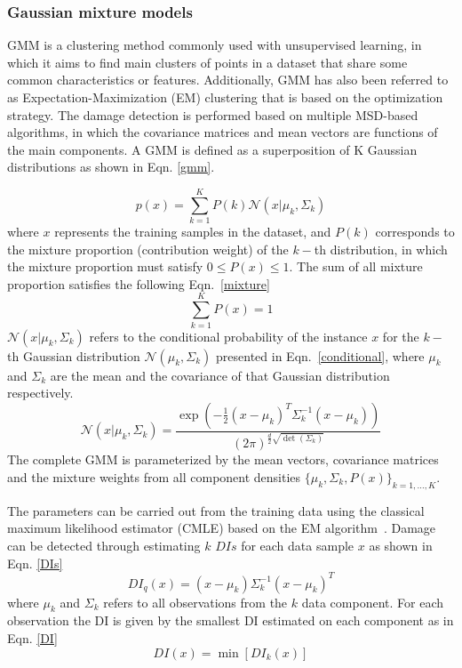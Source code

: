 \subsubsection{Gaussian mixture models}
GMM is a clustering method commonly used with unsupervised learning, in which it aims to find main clusters of points in a dataset that share some common characteristics or features.
Additionally, GMM has also been referred to as Expectation-Maximization (EM) clustering that is based on the optimization strategy.
The damage detection is performed based on multiple MSD-based algorithms, in which the covariance matrices and mean vectors are functions of the main components.
A GMM is defined as a superposition of K Gaussian distributions as shown in Eqn. \ref{gmm}.

\begin{equation}
	p(x) = \sum_{k=1}^K P(k) \mathcal{N}(x|\mu_k,\Sigma_k) 
	\label{gmm}
\end{equation}
where \(x\) represents the training samples in the dataset, and \(P(k)\) corresponds to the mixture proportion (contribution weight) of the \(k-\)th distribution, in which the mixture proportion must satisfy \(0\leq P(x)\leq 1\).
The sum of all mixture proportion satisfies the following Eqn.~\ref{mixture}
\begin{equation}
	\sum_{k=1}^{K}P(x) =1 
	\label{mixture}
\end{equation}  
\(\mathcal{N}(x|\mu_k,\Sigma_k)\) refers to the conditional probability of the instance \(x\) for the \(k-\)th Gaussian distribution \(\mathcal{N}(\mu_k,\Sigma_k)\) presented in Eqn.~\ref{conditional}, where \(\mu_k\) and \(\Sigma_k\) are the mean and the covariance of that Gaussian distribution respectively.
\begin{equation}
	\mathcal{N}(x|\mu_k,\Sigma_k) = \frac{\exp(-\frac{1}{2}(x-\mu_k)^T\Sigma_k^{-1}(x-\mu_k))}{(2\pi)^{\frac{d}{2}\sqrt{\det(\Sigma_k)}}}
	\label{conditional}		
\end{equation}
The complete GMM is parameterized by the mean vectors, covariance matrices and the mixture weights from all component densities \(\{\mu_k,\Sigma_k, P(x)\}_{k=1,\hdots,K}\).

The parameters can be carried out from the training data using the classical maximum likelihood estimator (CMLE) based on the EM algorithm~\cite{Dempster1977}.
Damage can be detected through estimating \(k\) \(DIs\) for each data sample \(x\) as shown in Eqn. \ref{DIs}
\begin{equation}
	DI_q(x) = (x-\mu_k)\Sigma_k^{-1}(x-\mu_k)^T
	\label{DIs}
\end{equation}
where \(\mu_k\) and \(\Sigma_k\) refers to all observations from the \(k\) data component.
For each observation the DI is given by the smallest DI estimated on each component as in Eqn. \ref{DI}
\begin{equation}
	DI(x) = \min[DI_k(x)]
	\label{DI}
\end{equation}
